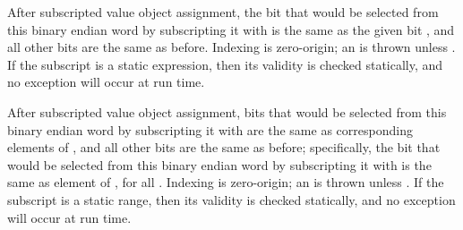After subscripted value object assignment,
the bit that would be selected from this binary endian word by subscripting it with
 is the same as the given bit ,
and all other bits are the same as before.
Indexing is zero-origin; an  is thrown unless .
If the subscript is a static expression, then its validity is checked statically,
and no exception will occur at run time.



After subscripted value object assignment,
bits that would be selected from this binary endian word by subscripting it with 
are the same as corresponding elements of , and all other bits are the same as before;
specifically, the bit that would be selected from this binary endian word by subscripting it with
is the same as element  of , for all .
Indexing is zero-origin; an  is thrown unless .
If the subscript is a static range, then its validity is checked statically,
and no exception will occur at run time.


